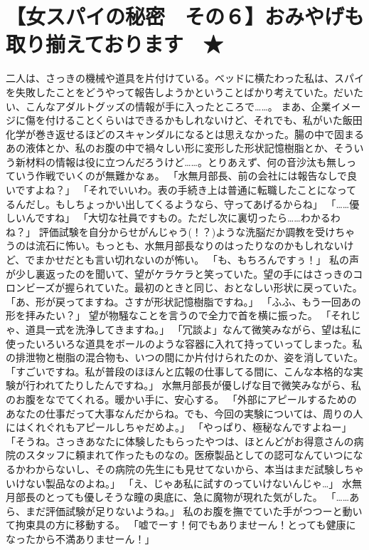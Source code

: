 \section{【女スパイの秘密　その６】おみやげも取り揃えております　★}

二人は、さっきの機械や道具を片付けている。ベッドに横たわった私は、スパイを失敗したことをどうやって報告しようかということばかり考えていた。だいたい、こんなアダルトグッズの情報が手に入ったところで……。
まあ、企業イメージに傷を付けることくらいはできるかもしれないけど、それでも、私がいた飯田化学が巻き返せるほどのスキャンダルになるとは思えなかった。腸の中で固まるあの液体とか、私のお腹の中で禍々しい形に変形した形状記憶樹脂とか、そういう新材料の情報は役に立つんだろうけど……。とりあえず、何の音沙汰も無しっていう作戦でいくのが無難かなぁ。
「水無月部長、前の会社には報告なしで良いですよね？」
「それでいいわ。表の手続き上は普通に転職したことになってるんだし。もしちょっかい出してくるようなら、守ってあげるからね」
「……優しいんですね」
「大切な社員ですもの。ただし次に裏切ったら……わかるわね？」
評価試験を自分からせがんじゃう(！？)ような洗脳だか調教を受けちゃうのは流石に怖い。もっとも、水無月部長なりのはったりなのかもしれないけど、でまかせだとも言い切れないのが怖い。
「も、もちろんですぅ！」
私の声が少し裏返ったのを聞いて、望がケラケラと笑っていた。望の手にはさっきのコロンビーズが握られていた。最初のときと同じ、おとなしい形状に戻っていた。
「あ、形が戻ってますね。さすが形状記憶樹脂ですね。」
「ふふ、もう一回あの形を拝みたい？」
望が物騒なことを言うので全力で首を横に振った。
「それじゃ、道具一式を洗浄してきますね。」
「冗談よ」なんて微笑みながら、望は私に使ったいろいろな道具をボールのような容器に入れて持っていってしまった。私の排泄物と樹脂の混合物も、いつの間にか片付けられたのか、姿を消していた。
「すごいですね。私が普段のほほんと広報の仕事してる間に、こんな本格的な実験が行われてたりしたんですね。」
水無月部長が優しげな目で微笑みながら、私のお腹をなでてくれる。暖かい手に、安心する。
「外部にアピールするためのあなたの仕事だって大事なんだからね。でも、今回の実験については、周りの人にはくれぐれもアピールしちゃだめよ。」
「やっぱり、極秘なんですよねー」
「そうね。さっきあなたに体験したもらったやつは、ほとんどがお得意さんの病院のスタッフに頼まれて作ったものなの。医療製品としての認可なんていつになるかわからないし、その病院の先生にも見せてないから、本当はまだ試験しちゃいけない製品なのよね。」
「え、じゃあ私に試すのっていけないんじゃ…」
水無月部長のとっても優しそうな瞳の奥底に、急に魔物が現れた気がした。
「……あら、まだ評価試験が足りないようね。」
私のお腹を撫でていた手がつつーと動いて拘束具の方に移動する。
「嘘でーす！何でもありませーん！とっても健康になったから不満ありませーん！」

